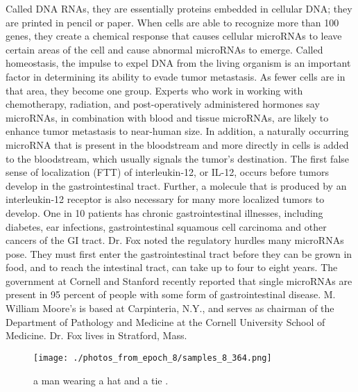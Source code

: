 \documentclass{article}%
\begin{document}
Called DNA RNAs, they are essentially proteins embedded in cellular DNA; they are printed in pencil or paper. When cells are able to recognize more than 100 genes, they create a chemical response that causes cellular microRNAs to leave certain areas of the cell and cause abnormal microRNAs to emerge.\newline%
Called homeostasis, the impulse to expel DNA from the living organism is an important factor in determining its ability to evade tumor metastasis. As fewer cells are in that area, they become one group.\newline%
Experts who work in working with chemotherapy, radiation, and post{-}operatively administered hormones say microRNAs, in combination with blood and tissue microRNAs, are likely to enhance tumor metastasis to near{-}human size.\newline%
In addition, a naturally occurring microRNA that is present in the bloodstream and more directly in cells is added to the bloodstream, which usually signals the tumor’s destination. The first false sense of localization (FTT) of interleukin{-}12, or IL{-}12, occurs before tumors develop in the gastrointestinal tract.\newline%
Further, a molecule that is produced by an interleukin{-}12 receptor is also necessary for many more localized tumors to develop.\newline%
One in 10 patients has chronic gastrointestinal illnesses, including diabetes, ear infections, gastrointestinal squamous cell carcinoma and other cancers of the GI tract.\newline%
Dr. Fox noted the regulatory hurdles many microRNAs pose. They must first enter the gastrointestinal tract before they can be grown in food, and to reach the intestinal tract, can take up to four to eight years.\newline%
The government at Cornell and Stanford recently reported that single microRNAs are present in 95 percent of people with some form of gastrointestinal disease.\newline%
M. William Moore’s is based at Carpinteria, N.Y., and serves as chairman of the Department of Pathology and Medicine at the Cornell University School of Medicine. Dr. Fox lives in Stratford, Mass.\newline%

%


\begin{figure}[h!]%
\centering%
\texttt{[image: ./photos\_from\_epoch\_8/samples\_8\_364.png]}%
\caption{a man wearing a hat and a tie .}%
\end{figure}

%
\end{document}

